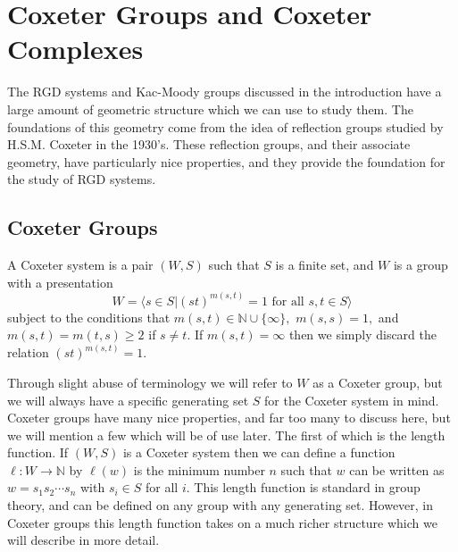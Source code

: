 \documentclass[class=book, crop=false,12 pt]{standalone}
\begin{document}
\chapter{Coxeter Groups and Coxeter Complexes}
\label{ch:Coxeter}
The RGD systems and Kac-Moody groups discussed in the introduction have a large amount of geometric structure which we can use to study them. The foundations of this geometry come from the idea of reflection groups studied by H.S.M. Coxeter in the 1930's. These reflection groups, and their associate geometry, have particularly nice properties, and they provide the foundation for the study of RGD systems.

\section{Coxeter Groups}
\label{sec:coxgrp}
\begin{defn}
	\label{def:coxgrp}
	A Coxeter system is a pair $(W,S)$ such that $S$ is a finite set, and $W$ is a group with a presentation
	\[
		W=\langle s\in S|(st)^{m(s,t)}=1\text{ for all }s,t\in S\rangle
	\]
	subject to the conditions that $m(s,t)\in \mathbb{N}\cup \{\infty\},$ $m(s,s)=1,$ and $m(s,t)=m(t,s)\ge 2$ if $s\neq t.$ If $m(s,t)=\infty$ then we simply discard the relation $(st)^{m(s,t)}=1.$
\end{defn}

Through slight abuse of terminology we will refer to $W$ as a Coxeter group, but we will always have a specific generating set $S$ for the Coxeter system in mind. Coxeter groups have many nice properties, and far too many to discuss here, but we will mention a few which will be of use later. The first of which is the length function. If $(W,S)$ is a Coxeter system then we can define a function $\ell:W\to \mathbb{N}$ by $\ell(w)$ is the minimum number $n$ such that $w$ can be written as $w=s_1s_2\cdots s_n$ with $s_i\in S$ for all $i.$ This length function is standard in group theory, and can be defined on any group with any generating set. However, in Coxeter groups this length function takes on a much richer structure which we will describe in more detail.
\end{document}

